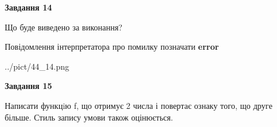 \documentclass[11pt, ukrainian]{article}
\begin{document}
{\begin {large}
{\begin {center}\textbf{Завдання 14}\end {center}}\par
Що буде виведено за виконання? \par
Повідомлення інтерпретатора про помилку позначати \textbf{error}

\begin{center}
	{../pict/44_14.png}
\end{center}
\newpage

{\begin {center}\textbf{Завдання 15}\end {center}}\par

Написати функцiю f, що отримує 2 числа і повертає ознаку того, що друге більше. Стиль запису умови також оцінюється.\par
\newpage

\end {large}}
\end{document}
